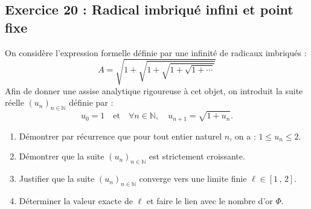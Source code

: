 \documentclass[11pt,a4paper]{article}
\newcommand{\N}{\mathbb{N}}
\begin{document}
\subsection*{Exercice 20 : Radical imbriqué infini et point fixe}
On considère l'expression formelle définie par une infinité de radicaux imbriqués :
\[
A = \sqrt{1 + \sqrt{1 + \sqrt{1 + \sqrt{1 + \cdots}}}}
\]
Afin de donner une assise analytique rigoureuse à cet objet, on introduit la suite réelle $(u_n)_{n \in \N}$ définie par :
\[
u_0 = 1 \quad \text{et} \quad \forall n \in \N, \quad u_{n+1} = \sqrt{1 + u_n}.
\]
\begin{enumerate}
    \item Démontrer par récurrence que pour tout entier naturel $n$, on a : $1 \le u_n \le 2$.
    \item Démontrer que la suite $(u_n)_{n \in \N}$ est strictement croissante.
    \item Justifier que la suite $(u_n)_{n \in \N}$ converge vers une limite finie $\ell \in [1\,,\, 2]$.
    \item Déterminer la valeur exacte de $\ell$ et faire le lien avec le nombre d'or $\Phi$.
\end{enumerate}
\end{document}
